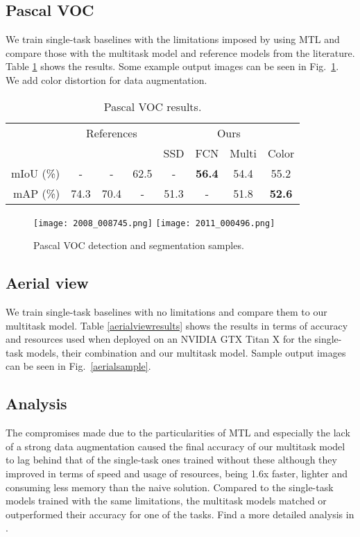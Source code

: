 \subsection{Pascal VOC}
We train single-task baselines with the limitations imposed by using MTL and compare those with the multitask model and reference models from the literature. Table \ref{multi-res} shows the results. Some example output images can be seen in Fig.~\ref{pascalsample}. We add color distortion for data augmentation.

\begin{table}[t]
\centering
\caption{Pascal VOC results.}
\label{multi-res}
\begin{tabular}{r|ccc|cccc}
                   & \multicolumn{3}{c}{References} \vline & \multicolumn{4}{c}{Ours} \\
                   & \cite{Laurmaa}  & \cite{SSD} & \cite{pynetbuilder} & SSD & FCN & Multi & Color \\ \hline
mIoU (\%)   &   -    &  -     &  62.5   &   -  & \textbf{56.4}  &  54.4  & 55.2 \\ 
mAP (\%)  &    74.3   & 70.4   &  - &  51.3  & - & 51.8 & \textbf{52.6}
\end{tabular}
\end{table}

\begin{figure}[t]
  \centering
  \texttt{[image: 2008\_008745.png]}\hfill
  \texttt{[image: 2011\_000496.png]}
  \vspace{-3mm}
  \caption{Pascal VOC detection and segmentation samples.}
  \label{pascalsample}
\end{figure}

\subsection{Aerial view}
We train single-task baselines with no limitations and compare them to our multitask model. Table \ref{aerialviewresults} shows the results in terms of accuracy and resources used when deployed on an NVIDIA GTX Titan X for the single-task models, their combination and our multitask model.  Sample output images can be seen in Fig.~\ref{aerialsample}.

\subsection{Analysis}
The compromises made due to the particularities of MTL and especially the lack of a strong data augmentation caused the final accuracy of our multitask model to lag behind that of the single-task ones trained without these although they improved in terms of speed and usage of resources, being 1.6x faster, lighter and consuming less memory than the naive solution. Compared to the single-task models trained with the same limitations, the multitask models matched or outperformed their accuracy for one of the tasks. Find a more detailed analysis in \cite{thesismiquel}.

